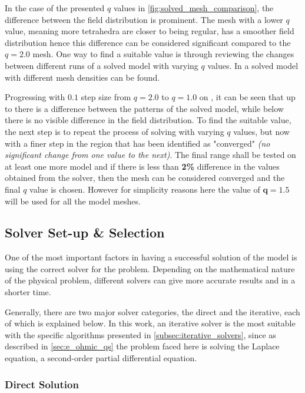 In the case of the presented $q$ values in \autoref{fig:solved_mesh_comparison}, the difference between the field distribution is prominent. The mesh with a lower $q$ value, meaning more tetrahedra are closer to being regular, has a smoother field distribution hence this difference can be considered significant compared to the $q=2.0$ mesh. One way to find a suitable value is through reviewing the changes between different runs of a solved model with varying $q$ values. In  a solved model with different mesh densities can be found.


Progressing with $0.1$ step size from $q=2.0$ to $q=1.0$ on , it can be seen that up to  there is a difference between the patterns of the solved model, while below  there is no visible difference in the field distribution. To find the suitable value, the next step is to repeat the process of solving with varying $q$ values, but now with a finer step in the region that has been identified as "converged" \textit{(no significant change from one value to the next)}. The final range shall be tested on at least one more model and if there is less than \textbf{2\%} difference in the values obtained from the solver, then the mesh can be considered converged and the final $q$ value is chosen. However for simplicity reasons here the value of $\boldsymbol{q=1.5}$ will be used for all the model meshes.
\subsection{Solver Set-up \& Selection}

One of the most important factors in having a successful solution of the model is using the correct solver for the problem. Depending on the mathematical nature of the physical problem, different solvers can give more accurate results and in a shorter time.

Generally, there are two major solver categories, the direct and the iterative, each of which is explained below. In this work, an iterative solver is the most suitable with the specific algorithms presented in \ref{subsec:iterative_solvers}, since as described in \ref{sec:e_ohmic_qs} the problem faced here is solving the Laplace equation, a second-order partial differential equation.

\subsubsection{Direct Solution}


